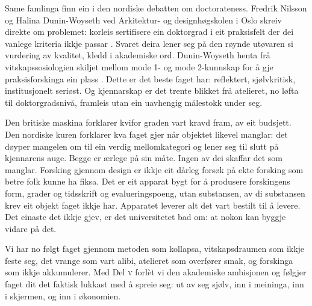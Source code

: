 Same famlinga finn ein i den nordiske debatten om doctorateness. Fredrik Nilsson og Halina Dunin-Woyseth ved Arkitektur- og designhøgskolen i Oslo skreiv direkte om problemet: korleis sertifisere ein doktorgrad i eit praksisfelt der dei vanlege kriteria ikkje passar \autocite{nilsson2012doctorateness}. Svaret deira lener seg på den røynde utøvaren si vurdering av kvalitet, kledd i akademiske ord. Dunin-Woyseth henta frå vitskapssosiologien skiljet mellom mode 1- og mode 2-kunnskap for å gje praksisforskinga ein plass \autocite{duninwoyseth2011making}. Dette er det beste faget har: reflektert, sjølvkritisk, institusjonelt seriøst. Og kjennarskap er det trente blikket frå atelieret, no løfta til doktorgradsnivå, framleis utan ein uavhengig målestokk under seg.

Den britiske maskina forklarer kvifor graden vart kravd fram, av eit budsjett. Den nordiske kuren forklarer kva faget gjer når objektet likevel manglar: det døyper mangelen om til ein verdig mellomkategori og lener seg til slutt på kjennarens auge. Begge er ærlege på sin måte. Ingen av dei skaffar det som manglar. Forsking gjennom design er ikkje eit dårleg forsøk på ekte forsking som betre folk kunne ha fiksa. Det er eit apparat bygt for å produsere forskingens form, grader og tidsskrift og evalueringspoeng, utan substansen, av di substansen krev eit objekt faget ikkje har. Apparatet leverer alt det vart bestilt til å levere. Det einaste det ikkje gjev, er det universitetet bad om: at nokon kan byggje vidare på det.

\vignett

Vi har no følgt faget gjennom metoden som kollapsa, vitskapsdraumen som ikkje feste seg, det vrange som vart alibi, atelieret som overfører smak, og forskinga som ikkje akkumulerer. Med Del \textsc{v} forlèt vi den akademiske ambisjonen og følgjer faget dit det faktisk lukkast med å spreie seg: ut av seg sjølv, inn i meininga, inn i skjermen, og inn i økonomien.


